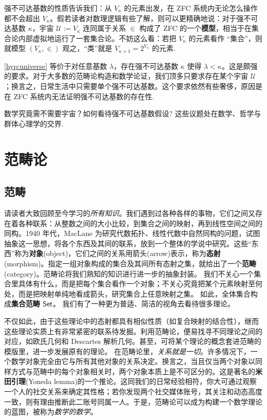 强不可达基数的性质告诉我们：从 $V_\kappa$ 的元素出发，在 ZFC 系统内无论怎么操作都不会超出 $V_\kappa$。假若读者对数理逻辑有些了解，则可以更精确地说：对于强不可达基数 $\kappa$，宇宙 $\mathcal{U} := V_\kappa$ 连同属于关系 $\in$ 构成了 ZFC 的一个\textbf{模型}，相当于在集合论内部虚拟地运行了一套集合论。不妨这么看：若把 $V_\kappa$ 的元素看作 “集合”，则就模型 $(V_\kappa,\in)$ 观之，“类”就是 $V_{\kappa+1} = 2^{V_\kappa}$ 的元素.

\begin{remark}
	\ref{hyp:universe} 等价于对任意基数 $\lambda$，存在强不可达基数 $\kappa$ 使得 $\lambda < \kappa$。这是颇强的要求。对于大多数的范畴论构造和数学论证，我们顶多只要求存在某个宇宙 $\mathcal{U}$；换言之，日常生活中只需要单个强不可达基数。这个要求依然有些奢侈，原因是在 ZFC 系统内无法证明强不可达基数的存在性.
\end{remark}

数学究竟需不需要宇宙？如何看待强不可达基数假设? 这些议题处在数学、哲学与群体心理学的交界.

\section{范畴论}
\subsection{范畴}
请读者大致回顾至今学习的\textit{所有知识}。我们遇到过各种各样的事物，它们之间又存在着各种联系：从整数之间的大小比较，到集合之间的映射，再到线性空间之间的同构。1940 年代，MacLane 为研究代数拓扑、线性代数中自然同构的问题，试图抽象这一思想，将各个东西及其间的联系，放到一个整体的学说中研究。这些“东西”称为\textbf{对象}(object)，它们之间的关系用箭头(arrow)表示，称为\textbf{态射}(morphism)。指定一组对象构成的集合及其间所有态射之集，就给出了一个\textbf{范畴}(category)。范畴论将我们熟知的知识进行进一步的抽象封装。
我们不关心一个集合里具体有什么，而是把每个集合看作一个对象；不关心究竟把某个元素映射至何处，而是把映射单纯地看成箭头，研究集合上任意映射之集。
如此，全体集合构成\textbf{集合范畴} $\mathsf{Set}$。
我们有了一种更为普适、简洁的视角去看待很多理论。

不仅如此，由于这些理论中的态射都具有相似性质（如复合映射的结合性），继而这些理论实质上有非常紧密的联系待发掘。利用范畴论，便易找寻不同理论之间的对应，如欧氏几何和 Descartes 解析几何。甚至，可将某个理论的概念套进范畴的模版里，进一步发展原有的理论。
在范畴论里，\textit{关系就是一切}。许多情况下，一个数学对象完全由它与所有其他对象的关系决定。换言之，当且仅当两个对象以同样方式与范畴中的每个对象相关时，两个对象本质上是不可区分的。这是著名的\textbf{米田引理}(Yoneda lemma)的一个推论。这同我们的日常经验相符，你大可通过观察一个人的社交关系来确定其性格；若你发现两个社交媒体账号，其关注和动态高度一致，则有理由推断此二账号同属一人。于是，范畴论可以成为构建一个数学理论的蓝图，被称为\textit{数学的数学}。

